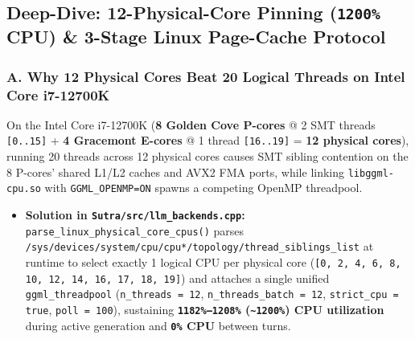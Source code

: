 \documentclass[11pt,a4paper]{article}
\begin{document}
\subsection{Deep-Dive: 12-Physical-Core Pinning (\texttt{1200\%} CPU) \& 3-Stage Linux Page-Cache Protocol}

\subsubsection{A. Why 12 Physical Cores Beat 20 Logical Threads on Intel Core i7-12700K}
On the Intel Core i7-12700K (\textbf{8 Golden Cove P-cores} @ 2 SMT threads \texttt{[0..15]} + \textbf{4 Gracemont E-cores} @ 1 thread \texttt{[16..19]} = \textbf{12 physical cores}), running 20 threads across 12 physical cores causes SMT sibling contention on the 8 P-cores' shared L1/L2 caches and AVX2 FMA ports, while linking \texttt{libggml-cpu.so} with \texttt{GGML\_OPENMP=ON} spawns a competing OpenMP threadpool.
\begin{itemize}[leftmargin=1.5em]
  \item \textbf{Solution in \texttt{Sutra/src/llm\_backends.cpp}:} \texttt{parse\_linux\_physical\_core\_cpus()} parses \texttt{/sys/devices/system/cpu/cpu*/topology/thread\_siblings\_list} at runtime to select exactly 1 logical CPU per physical core (\texttt{[0, 2, 4, 6, 8, 10, 12, 14, 16, 17, 18, 19]}) and attaches a single unified \texttt{ggml\_threadpool} (\texttt{n\_threads = 12}, \texttt{n\_threads\_batch = 12}, \texttt{strict\_cpu = true}, \texttt{poll = 100}), sustaining \textbf{\texttt{1182\%--1208\%} (\texttt{\textasciitilde 1200\%}) CPU utilization} during active generation and \textbf{\texttt{0\%} CPU} between turns.
\end{itemize}
\end{document}
